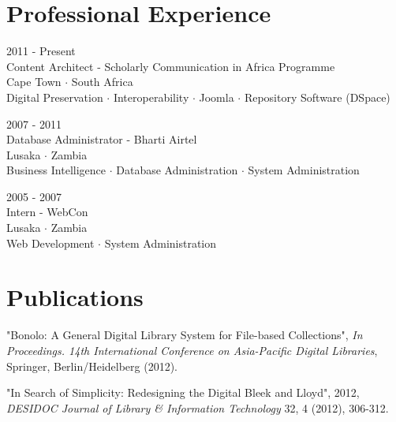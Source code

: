 \documentclass[letterpaper]{article}
\def\footerlink{http://lightonphiri.org/docs/cv.pdf}
\renewenvironment{itemize}{
  \begin{list}{}{
    \setlength{\leftmargin}{1.5em}
  }
}{
  \end{list}
}
\begin{document}
\section*{Professional Experience}

\begin{itemize}
\item 2011 - Present \\
Content Architect - Scholarly Communication in Africa Programme \\
Cape Town $\cdot$ South Africa \\
Digital Preservation $\cdot$ Interoperability $\cdot$ Joomla $\cdot$ Repository Software (DSpace)
\item 2007 - 2011 \\
Database Administrator - Bharti Airtel \\
Lusaka $\cdot$ Zambia \\
Business Intelligence $\cdot$ Database Administration $\cdot$ System Administration
\item 2005 - 2007 \\
Intern - WebCon \\
Lusaka $\cdot$ Zambia \\
Web Development $\cdot$ System Administration
\end{itemize}


\section*{Publications}

\begin{itemize}
\item "Bonolo: A General Digital Library System for File-based Collections",
  {\it In Proceedings. 14th International Conference on Asia-Pacific Digital Libraries}, Springer, Berlin/Heidelberg (2012).
\item "In Search of Simplicity: Redesigning the Digital Bleek and Lloyd", 2012, {\it DESIDOC Journal of Library \& Information Technology} 32, 4 (2012), 306-312.
\end{itemize}

\bigskip

\end{document}
